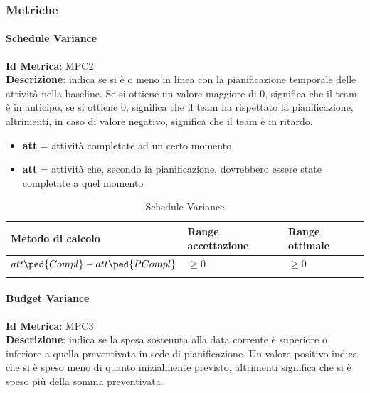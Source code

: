 		\subsubsection{Metriche}
			\paragraph{Schedule Variance}
			\textbf{Id Metrica}: \hypertarget{MPC2}{MPC2}\\
			\textbf{Descrizione}: indica se si è o meno in linea con la pianificazione temporale delle attività nella baseline.
			Se si ottiene un valore maggiore di 0, significa che il team è in anticipo, se si ottiene 0, significa che il team ha rispettato la pianificazione, altrimenti, in caso di valore negativo, significa che il team è in ritardo.
			
				\begin{itemize}
				\item \textbf{att} = attività completate ad un certo momento
				\item \textbf{att} = attività che, secondo la pianificazione, dovrebbero essere state completate a quel momento
			\end{itemize}
			
			\begin{longtable}{>{\centering\arraybackslash}p{5cm}|>{\centering\arraybackslash}p{5cm} | >{\centering\arraybackslash}p{5cm}}
					\hline
					\rowcolor{Gray}
					\textbf{Metodo di calcolo} & \textbf{Range accettazione} & \textbf{Range ottimale} \\
					\hline
					\begin{math}
					{att\ped{Compl} - att\ped{PCompl}}
					\end{math}  &  \begin{math}\geq{0} \end{math}  &  \begin{math}\geq{0} \end{math} 
				\\
				\caption{Schedule Variance}
			\end{longtable}
		\clearpage
		
		\paragraph{Budget Variance}
		\textbf{Id Metrica}: \hypertarget{MPC3}{MPC3}\\
		\textbf{Descrizione}: indica se la spesa sostenuta alla data corrente è superiore o inferiore a quella preventivata in sede di pianificazione.
		Un valore positivo indica che si è speso meno di quanto inizialmente previsto, altrimenti significa che si è speso più della somma preventivata.
		
